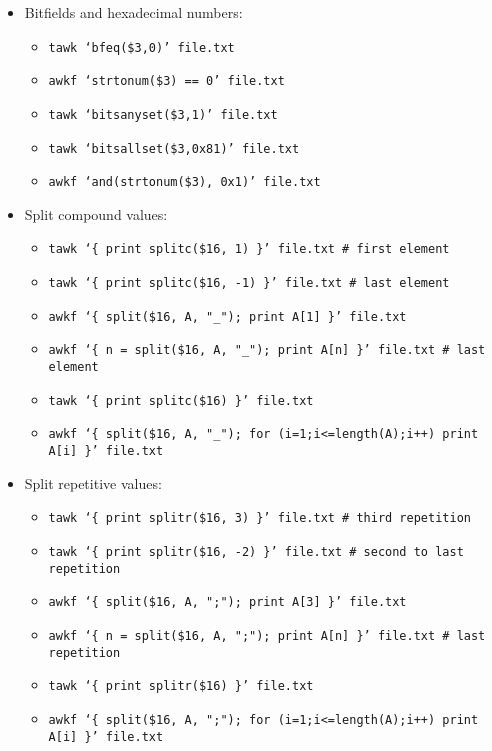 \documentclass[documentation]{subfiles}
\begin{document}
\begin{itemize}
    \item Bitfields and hexadecimal numbers:
        \begin{itemize}
            \item {\tt tawk `bfeq(\$3,0)' file.txt}
            \item {\tt awkf `strtonum(\$3) == 0' file.txt}
            \item {\tt tawk `bitsanyset(\$3,1)' file.txt}
            \item {\tt tawk `bitsallset(\$3,0x81)' file.txt}
            \item {\tt awkf `and(strtonum(\$3), 0x1)' file.txt}
        \end{itemize}

    \item Split compound values:
        \begin{itemize}
            \item {\tt tawk `\{ print splitc(\$16, 1) \}' file.txt \# first element}
            \item {\tt tawk `\{ print splitc(\$16, -1) \}' file.txt \# last element}
            \item {\tt awkf `\{ split(\$16, A, "\_"); print A[1] \}' file.txt}
            \item {\tt awkf `\{ n = split(\$16, A, "\_"); print A[n] \}' file.txt \# last element}
            \item {\tt tawk `\{ print splitc(\$16) \}' file.txt}
            \item {\tt awkf `\{ split(\$16, A, "\_"); for (i=1;i<=length(A);i++) print A[i] \}' file.txt}
        \end{itemize}

    \item Split repetitive values:
        \begin{itemize}
            \item {\tt tawk `\{ print splitr(\$16, 3) \}' file.txt \# third repetition}
            \item {\tt tawk `\{ print splitr(\$16, -2) \}' file.txt \# second to last repetition}
            \item {\tt awkf `\{ split(\$16, A, ";"); print A[3] \}' file.txt}
            \item {\tt awkf `\{ n = split(\$16, A, ";"); print A[n] \}' file.txt \# last repetition}
            \item {\tt tawk `\{ print splitr(\$16) \}' file.txt}
            \item {\tt awkf `\{ split(\$16, A, ";"); for (i=1;i<=length(A);i++) print A[i] \}' file.txt}
        \end{itemize}


\end{itemize}
\end{document}
